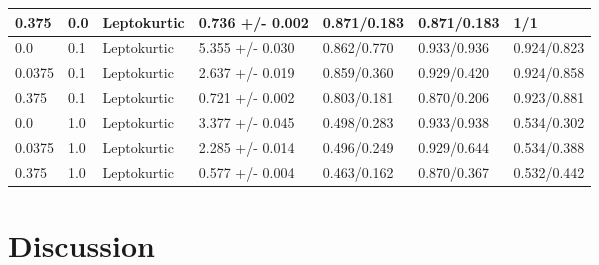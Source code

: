 \begin{table}[h]
\begin{tabular}{p{}|p{}|p{}|p{}|p{}|p{}|p{}}
0.375                     	&	0.0	& Leptokurtic      &	0.736 +/- 0.002	&	0.871/0.183	&	0.871/0.183	&	1/1	\\ \hline
0.0                       	&	0.1	& Leptokurtic      &	5.355 +/- 0.030	&	0.862/0.770	&	0.933/0.936	&	0.924/0.823	\\
0.0375                    	&	0.1	& Leptokurtic      &	2.637 +/- 0.019	&	0.859/0.360	&	0.929/0.420	&	0.924/0.858	\\
0.375                     	&	0.1	& Leptokurtic      &	0.721 +/- 0.002	&	0.803/0.181	&	0.870/0.206	&	0.923/0.881	\\ \hline
0.0                       	&	1.0	& Leptokurtic      &	3.377 +/- 0.045	&	0.498/0.283	&	0.933/0.938	&	0.534/0.302	\\
0.0375                    	&	1.0	& Leptokurtic      &	2.285 +/- 0.014	&	0.496/0.249	&	0.929/0.644	&	0.534/0.388	\\
0.375                     	&	1.0	& Leptokurtic      &	0.577 +/- 0.004	&	0.463/0.162	&	0.870/0.367	&	0.532/0.442	\\ \hline
\end{tabular}
\end{table}








\section*{Discussion}



